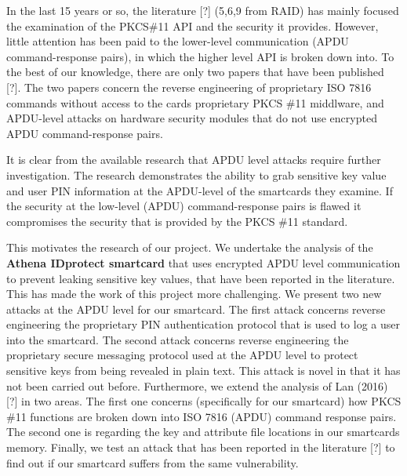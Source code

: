 \documentclass[bsc,frontabs,twoside,singlespacing,parskip,deptreport]{infthesis}     %
\begin{document}
In the last 15 years or so, the literature [?] (5,6,9 from RAID) has mainly focused the examination of the PKCS\#11 API and the security it provides. However, little attention has been paid to the lower-level communication (APDU command-response pairs), in which the higher level API is broken down into. To the best of our knowledge, there are only two papers that have been published [?]. The two papers concern the reverse engineering of proprietary ISO 7816 commands without access to the cards proprietary PKCS \#11 middlware, and APDU-level attacks on hardware security modules that do not use encrypted APDU command-response pairs.

It is clear from the available research that APDU level attacks require further investigation. The research demonstrates the ability to grab sensitive key value and user PIN information at the APDU-level of the smartcards they examine. If the security at the low-level (APDU) command-response pairs is flawed it compromises the security that is provided by the PKCS \#11 standard. 


This motivates the research of our project. We undertake the analysis of the \textbf{Athena IDprotect smartcard} that uses encrypted APDU level communication to prevent leaking sensitive key values, that have been reported in the literature. This has made the work of this project more challenging. We present two new attacks at the APDU level for our smartcard. The first attack concerns reverse engineering the proprietary PIN authentication protocol that is used to log a user into the smartcard. The second attack concerns reverse engineering the proprietary secure messaging protocol used at the APDU level to protect sensitive keys from being revealed in plain text. This attack is novel in that it has not been carried out before. Furthermore, we extend the analysis of Lan (2016) [?] in two areas. The first one concerns (specifically for our smartcard) how PKCS \#11 functions are broken down into ISO 7816 (APDU) command response pairs. The second one is regarding the key and attribute file locations in our smartcards memory. Finally, we test an attack that has been reported in the literature [?] to find out if our smartcard suffers from the same vulnerability.
\end{document}
